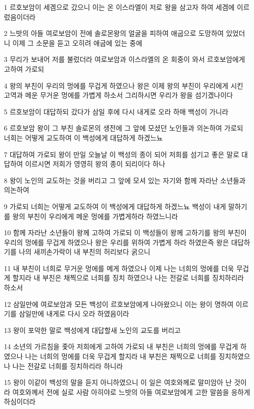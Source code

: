\par 1 르호보암이 세겜으로 갔으니 이는 온 이스라엘이 저로 왕을 삼고자 하여 세겜에 이르렀음이더라
\par 2 느밧의 아들 여로보암이 전에 솔로몬왕의 얼굴을 피하여 애굽으로 도망하여 있었더니 이제 그 소문을 듣고 오히려 애굽에 있는 중에
\par 3 무리가 보내어 저를 불렀더라 여로보암과 이스라엘의 온 회중이 와서 르호보암에게 고하여 가로되
\par 4 왕의 부친이 우리의 멍에를 무겁게 하였으나 왕은 이제 왕의 부친이 우리에게 시킨 고역과 메운 무거운 멍에를 가볍게 하소서 그리하시면 우리가 왕을 섬기겠나이다
\par 5 르호보암이 대답하되 갔다가 삼일 후에 다시 내게로 오라 하매 백성이 가니라
\par 6 르호보암 왕이 그 부친 솔로몬의 생전에 그 앞에 모셨던 노인들과 의논하여 가로되 너희는 어떻게 교도하여 이 백성에게 대답하게 하겠느뇨
\par 7 대답하여 가로되 왕이 만일 오늘날 이 백성의 종이 되어 저희를 섬기고 좋은 말로 대답하여 이르시면 저희가 영영히 왕의 종이 되리이다 하나
\par 8 왕이 노인의 교도하는 것을 버리고 그 앞에 모셔 있는 자기와 함께 자라난 소년들과 의논하여
\par 9 가로되 너희는 어떻게 교도하여 이 백성에게 대답하게 하겠느뇨 백성이 내게 말하기를 왕의 부친이 우리에게 메운 멍에를 가볍게하라 하였느니라
\par 10 함께 자라난 소년들이 왕께 고하여 가로되 이 백성들이 왕께 고하기를 왕의 부친이 우리의 멍에를 무겁게 하였으나 왕은 우리를 위하여 가볍게 하라 하였은즉 왕은 대답하기를 나의 새끼손가락이 내 부친의 허리보다 굵으니
\par 11 내 부친이 너희로 무거운 멍에를 메게 하였으나 이제 나는 너희의 멍에를 더욱 무겁게 할지라 내 부친은 채찍으로 너희를 징치 하였으나 나는 전갈로 너희를 징치하리라 하소서
\par 12 삼일만에 여로보암과 모든 백성이 르호보암에게 나아왔으니 이는 왕이 명하여 이르기를 삼일만에 내게로 다시 오라 하였음이라
\par 13 왕이 포악한 말로 백성에게 대답할새 노인의 교도를 버리고
\par 14 소년의 가르침을 좇아 저희에게 고하여 가로되 내 부친은 너희의 멍에를 무겁게 하였으나 나는 너희의 멍에를 더욱 무겁게 할지라 내 부친은 채찍으로 너희를 징치하였으나 나는 전갈로 너희를 징치하리라 하니라
\par 15 왕이 이같이 백성의 말을 듣지 아니하였으니 이 일은 여호와께로 말미암아 난 것이라 여호와께서 전에 실로 사람 아히야로 느밧의 아들 여로보암에게 고한 말씀을 응하게 하심이더라
